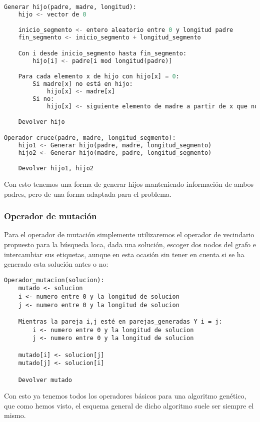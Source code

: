 \begin{lstlisting}[language=python]
Generar hijo(padre, madre, longitud):
	hijo <- vector de 0

	inicio_segmento <- entero aleatorio entre 0 y longitud padre
	fin_segmento <- inicio_segmento + longitud_segmento

	Con i desde inicio_segmento hasta fin_segmento:
		hijo[i] <- padre[i mod longitud(padre)]

	Para cada elemento x de hijo con hijo[x] = 0:
		Si madre[x] no está en hijo:
			hijo[x] <- madre[x]
		Si no:
			hijo[x] <- siguiente elemento de madre a partir de x que no esté en hijo

	Devolver hijo

Operador cruce(padre, madre, longitud_segmento):
	hijo1 <- Generar hijo(padre, madre, longitud_segmento)
	hijo2 <- Generar hijo(madre, padre, longitud_segmento)

	Devolver hijo1, hijo2
\end{lstlisting}

Con esto tenemos una forma de generar hijos manteniendo información de ambos padres, pero de una forma adaptada para el problema.

\subsubsection{Operador de mutación}

Para el operador de mutación simplemente utilizaremos el operador de vecindario propuesto para la búsqueda loca, dada una solución, escoger dos nodos del grafo e intercambiar sus etiquetas, aunque en esta ocasión sin tener en cuenta si se ha generado esta solución antes o no:


\begin{lstlisting}
Operador_mutacion(solucion):
	mutado <- solucion
	i <- numero entre 0 y la longitud de solucion
	j <- numero entre 0 y la longitud de solucion

	Mientras la pareja i,j esté en parejas_generadas Y i = j:
		i <- numero entre 0 y la longitud de solucion
		j <- numero entre 0 y la longitud de solucion

	mutado[i] <- solucion[j]
	mutado[j] <- solucion[i]

	Devolver mutado
\end{lstlisting}

Con esto ya tenemos todos los operadores básicos para una algoritmo genético, que como hemos visto, el esquema general de dicho algoritmo suele ser siempre el mismo.

